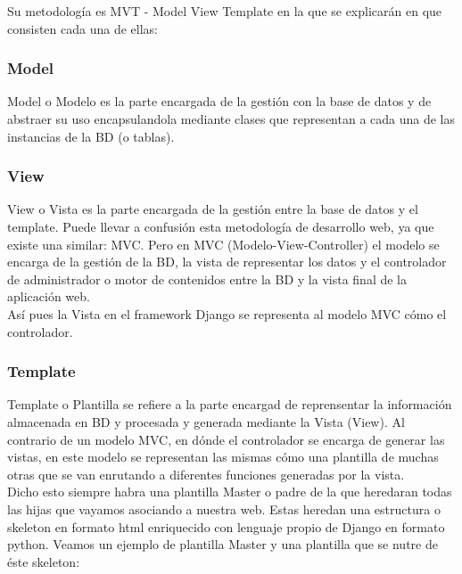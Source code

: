 Su metodología es MVT - Model View Template en la que se explicarán en que consisten cada una de ellas:

\subsubsection{Model}

Model o Modelo es la parte encargada de la gestión con la base de datos y de abstraer su uso encapsulandola mediante clases que representan a cada una de las instancias de la BD (o tablas).\\

\subsubsection{View}

View o Vista es la parte encargada de la gestión entre la base de datos y el template. Puede llevar a confusión esta metodología de desarrollo web, ya que existe una similar: MVC. Pero en MVC (Modelo-View-Controller) el modelo se encarga de la gestión de la BD, la vista de representar los datos y el controlador de administrador o motor de contenidos entre la BD y la vista final de la aplicación web. \\

Así pues la Vista en el framework Django se representa al modelo MVC cómo el controlador.\\

\subsubsection{Template}

Template o Plantilla se refiere a la parte encargad de reprensentar la información almacenada en BD y procesada y generada mediante la Vista (View). Al contrario de un modelo MVC, en dónde el controlador se encarga de generar las vistas, en este modelo se representan las mismas cómo una plantilla de muchas otras que se van enrutando a diferentes funciones generadas por la vista. \\

Dicho esto siempre habra una plantilla Master o padre de la que heredaran todas las hijas que vayamos asociando a nuestra web. Estas heredan una estructura o skeleton en formato html enriquecido con lenguaje propio de Django en formato python. Veamos un ejemplo de plantilla Master y una plantilla que se nutre de éste skeleton:\\

